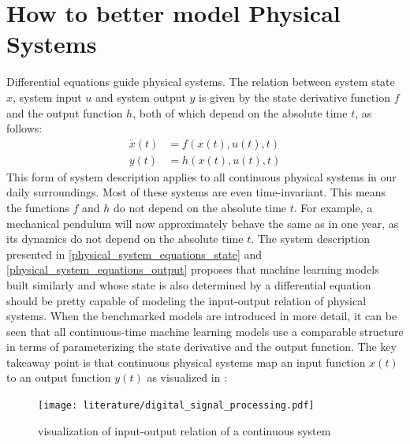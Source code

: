 \documentclass[draft,final]{vutinfth} %
\begin{document}
\section{How to better model Physical Systems} \label{physical_systems}
Differential equations guide physical systems. The relation between system state $x$, system input $u$ and system output $y$ is given by the state derivative function $f$ and the output function $h$, both of which depend on the absolute time $t$, as follows:
\begin{align}
\label{physical_system_equations_state}
\dot x(t) &= f(x(t),u(t),t) \\
\label{physical_system_equations_output}
y(t) &= h(x(t),u(t),t)
\end{align}
This form of system description applies to all continuous physical systems in our daily surroundings. Most of these systems are even time-invariant.
This means the functions $f$ and $h$ do not depend on the absolute time $t$.
For example, a mechanical pendulum will now approximately behave the same as in one year, as its dynamics do not depend on the absolute time $t$.
The system description presented in \ref{physical_system_equations_state} and \ref{physical_system_equations_output} proposes that machine learning models built similarly and whose state is also determined by a differential equation should be pretty capable of modeling the input-output relation of physical systems.
When the benchmarked models are introduced in more detail, it can be seen that all continuous-time machine learning models use a comparable structure in terms of parameterizing the state derivative and the output function.
The key takeaway point is that continuous physical systems map an input function $x(t)$ to an output function $y(t)$ as visualized in \cite[p. 102]{dsp}:
\begin{figure}[H]
\centering{}
\texttt{[image: literature/digital\_signal\_processing.pdf]}
\caption{visualization of input-output relation of a continuous system}
\label{fig:continuous_system_vis}
\end{figure}
\end{document}
